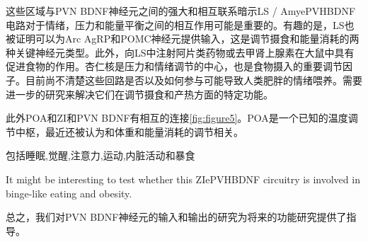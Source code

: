 这些区域与PVN BDNF神经元之间的强大和相互联系暗示LS / AmyePVHBDNF电路对于情绪，压力和能量平衡之间的相互作用可能是重要的。有趣的是，LS也被证明可以为Arc AgRP和POMC神经元提供输入，这是调节摄食和能量消耗的两种关键神经元类型\citep{wang2015whole}。此外，向LS中注射阿片类药物或去甲肾上腺素在大鼠中具有促进食物的作用\citep{majeed1986stimulation,scopinho2008alpha1}。杏仁核是压力和情绪调节的中心，也是食物摄入的重要调节因子\citep{zhang2011amygdala,cai2014central,douglass2017central}。目前尚不清楚这些回路是否以及如何参与可能导致人类肥胖的情绪喂养\citep{kishi2005body}。需要进一步的研究来解决它们在调节摄食和产热方面的特定功能。



此外POA和ZI和PVN BDNF有相互的连接\figurename{\ref{fig:figure5}}。POA是一个已知的温度调节中枢，最近还被认为和体重和能量消耗的调节相关\citep{morrison2011central,yu2016glutamatergic,zhao2017hypothalamic,tan2018regulation}。

包括睡眠\citep{liu2017lhx6},觉醒\citep{roger1985afferents,power2001evidence},注意力\citep{chometton2017rostromedial,tait2017effects},运动\citep{milner1988electrical,supko1991activation,murer1993circling,perier2002behavioral},内脏活动\citep{huang1974differential,walsh1977some}和暴食\citep{zhang2017rapid}

It might be interesting to test whether this ZIePVHBDNF circuitry is involved in binge-like eating and obesity. 

总之，我们对PVN BDNF神经元的输入和输出的研究为将来的功能研究提供了指导。



